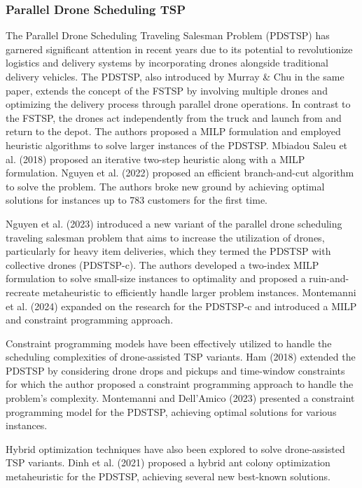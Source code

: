\documentclass[twocolumn]{article}
\begin{document}
	\subsubsection{Parallel Drone Scheduling TSP}
	The Parallel Drone Scheduling Traveling Salesman Problem (PDSTSP) has garnered significant attention in recent years due to its potential to revolutionize logistics and delivery systems by incorporating drones alongside traditional delivery vehicles. The PDSTSP, also introduced by Murray \& Chu in the same paper, extends the concept of the FSTSP by involving multiple drones and optimizing the delivery process through parallel drone operations. In contrast to the FSTSP, the drones act independently from the truck and launch from and return to the depot. The authors proposed a  MILP formulation and employed heuristic algorithms to solve larger instances of the PDSTSP. Mbiadou Saleu et al. (2018) proposed an iterative two-step heuristic along with a MILP formulation. Nguyen et al. (2022) proposed an efficient branch-and-cut algorithm to solve the problem. The authors broke new ground by achieving optimal solutions for instances up to 783 customers for the first time.
	\par 
	Nguyen et al. (2023) introduced a new variant of the parallel drone scheduling traveling salesman problem that aims to increase the utilization of drones, particularly for heavy item deliveries, which they termed the PDSTSP with collective drones (PDSTSP-c).
	The authors developed a two-index MILP formulation to solve small-size instances to optimality and proposed a ruin-and-recreate metaheuristic to efficiently handle larger problem instances. Montemanni et al. (2024) expanded on the research for the PDSTSP-c and introduced a MILP and constraint programming approach.
	\par 
	Constraint programming models have been effectively utilized to handle the scheduling complexities of drone-assisted TSP variants. Ham (2018) extended the PDSTSP by considering drone drops and pickups and time-window constraints for which the author proposed a constraint programming approach to handle the problem's complexity. Montemanni and Dell’Amico (2023) presented a constraint programming model for the PDSTSP, achieving optimal solutions for various instances.
	\par 
	Hybrid optimization techniques have also been explored to solve drone-assisted TSP variants. Dinh et al. (2021) proposed a hybrid ant colony optimization metaheuristic for the PDSTSP, achieving several new best-known solutions. 
\end{document}
